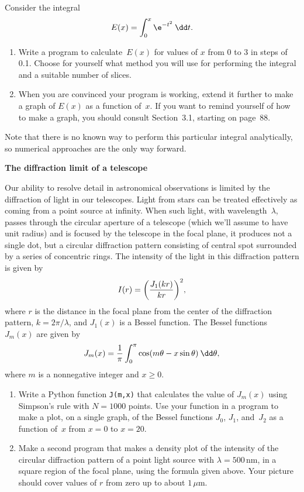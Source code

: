 \documentclass[12pt]{article}
\begin{document}
\begin{exercises}

\exercise Consider the integral
\begin{displaymath}
E(x) = \int_0^x \e^{-t^2} \>\dd t.
\end{displaymath}
\begin{enumerate}\setlength{\itemsep}{0pt}
\item Write a program to calculate~$E(x)$ for values of $x$ from 0 to 3 in
  steps of 0.1.  Choose for yourself what method you will use for
  performing the integral and a suitable number of slices.
\item When you are convinced your program is working, extend it further to
  make a graph of $E(x)$ as a function of~$x$.  If you want to remind
  yourself of how to make a graph, you should consult Section~3.1, starting
  on page~88.
\end{enumerate}
Note that there is no known way to perform this particular integral
analytically, so numerical approaches are the only way forward.



\exercise \textbf{The diffraction limit of a telescope}

\exskip Our ability to resolve detail in astronomical observations is
limited by the diffraction of light in our telescopes.  Light from stars
can be treated effectively as coming from a point source at infinity.  When
such light, with wavelength~$\lambda$, passes through the circular aperture
of a telescope (which we'll assume to have unit radius) and is focused by
the telescope in the focal plane, it produces not a single dot, but a
circular diffraction pattern consisting of central spot surrounded by a
series of concentric rings.  The intensity of the light in this diffraction
pattern is given by
\begin{displaymath}
I(r) = \biggl( {J_1(kr)\over kr} \biggr)^2,
\end{displaymath}
where $r$ is the distance in the focal plane from the center of the
diffraction pattern, $k=2\pi/\lambda$, and $J_1(x)$ is a Bessel function.
The Bessel functions~$J_m(x)$ are given by
\begin{displaymath}
J_m(x) = {1\over\pi} \int_0^\pi \cos(m\theta - x\sin\theta) \>\dd\theta,
\end{displaymath}
where $m$ is a nonnegative integer and $x\ge0$.
\begin{enumerate}\setlength{\itemsep}{0pt}
\item Write a Python function \verb|J(m,x)| that calculates the value of
  $J_m(x)$ using Simpson's rule with $N=1000$ points.  Use your
  function in a program to make a plot, on a single graph, of the Bessel
  functions $J_0$, $J_1$, and~$J_2$ as a function of~$x$ from $x=0$ to
  $x=20$.
\item Make a second program that makes a density plot of the intensity of
  the circular diffraction pattern of a point light source with
  $\lambda=500\,$nm, in a square region of the focal plane, using the
  formula given above.  Your picture should cover values of $r$ from zero
  up to about $1\,\mu$m.
\end{enumerate}


\end{exercises}
\end{document}
